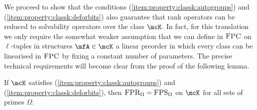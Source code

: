 \documentclass[a4paper,UKenglish]{lipics}
\newcommand{\logic}[1]{\ensuremath{\textsc{#1}}\xspace}
\newcommand{\FPC}{\logic{FPC}}
\newcommand{\FPSx}[1]{\ensuremath{\logic{FPS}_{#1}}\xspace}
\newcommand{\FPRx}[1]{\ensuremath{\logic{FPR}_{#1}}\xspace}
\theoremstyle{plain}
\begin{document}
\bigskip
We proceed to show that the conditions 
(\ref{item:property:classk:autogroups}) and
 (\ref{item:property:classk:deforbits}) also  guarantee that 
rank operators can be reduced to solvability operators over the class 
$\mcK$. In fact, for this translation we only require the somewhat weaker 
assumption that we can define in \FPC on $\ell$-tuples in 
structures $\mfA \in \mcK$ a linear preorder in which every class can be 
linearised in \FPC by fixing a constant number of parameters. 
The precise technical requirements will become clear from the proof of the 
following lemma.
\begin{lemma}\label{lemma:rank:to:solve}
If $\mcK$ satisfies (\ref{item:property:classk:autogroups})
 and (\ref{item:property:classk:deforbits}), then
 $\FPRx{\Omega} = \FPSx{\Omega}$ on $\mcK$ for all sets of primes $\Omega$.
\end{lemma}
\end{document}

